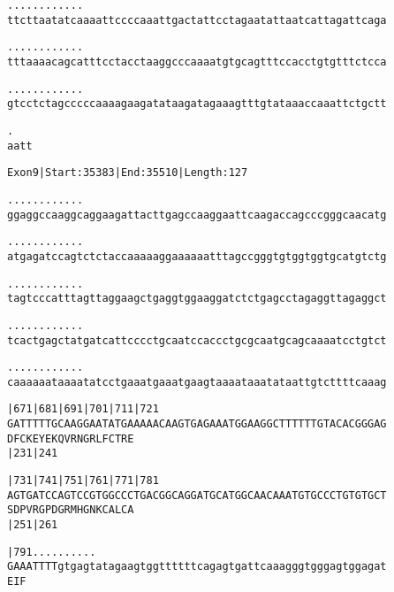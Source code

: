 \documentclass{article}
\begin{document}
\newpage
\begin{alltt}
   .    .    .    .    .    .    .    .    .    .    .    .
ttcttaatatcaaaattccccaaattgactattcctagaatattaatcattagattcaga



   .    .    .    .    .    .    .    .    .    .    .    .
tttaaaacagcatttcctacctaaggcccaaaatgtgcagtttccacctgtgtttctcca



   .    .    .    .    .    .    .    .    .    .    .    .
gtcctctagcccccaaaagaagatataagatagaaagtttgtataaaccaaattctgctt



   .
aatt


\end{alltt}
\newpage
\begin{alltt}
Exon 9 | Start: 35383 | End: 35510 | Length: 127

.    .    .    .    .    .    .    .    .    .    .    .
ggaggccaaggcaggaagattacttgagccaaggaattcaagaccagcccgggcaacatg



.    .    .    .    .    .    .    .    .    .    .    .
atgagatccagtctctaccaaaaaggaaaaaatttagccgggtgtggtggtgcatgtctg



.    .    .    .    .    .    .    .    .    .    .    .
tagtcccatttagttaggaagctgaggtggaaggatctctgagcctagaggttagaggct



.    .    .    .    .    .    .    .    .    .    .    .
tcactgagctatgatcattcccctgcaatccaccctgcgcaatgcagcaaaatcctgtct



.    .    .    .    .    .    .    .    .    .    .    .
caaaaaataaaatatcctgaaatgaaatgaagtaaaataaatataattgtcttttcaaag



    |671      |681      |691      |701      |711      |721
GATTTTTGCAAGGAATATGAAAAACAAGTGAGAAATGGAAGGCTTTTTTGTACACGGGAG
D  F  C  K  E  Y  E  K  Q  V  R  N  G  R  L  F  C  T  R  E
                        |231                          |241

    |731      |741      |751      |761      |771      |781
AGTGATCCAGTCCGTGGCCCTGACGGCAGGATGCATGGCAACAAATGTGCCCTGTGTGCT
S  D  P  V  R  G  P  D  G  R  M  H  G  N  K  C  A  L  C  A
                        |251                          |261

    |791    .    .    .    .    .    .    .    .    .    .
GAAATTTTgtgagtatagaagtggttttttcagagtgattcaaagggtgggagtggagat
E  I  F


\end{alltt}
\end{document}
